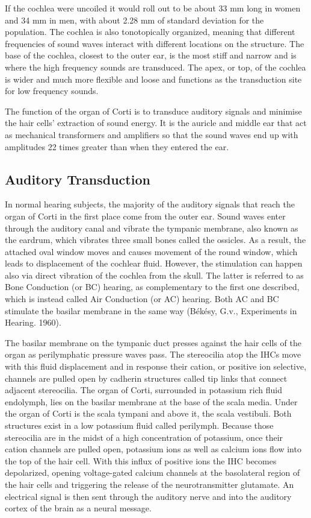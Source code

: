 If the cochlea were uncoiled it would roll out to be about 33 mm long in women and 34 mm in men, with about 2.28 mm of standard deviation for the population. The cochlea is also tonotopically organized, meaning that different frequencies of sound waves interact with different locations on the structure. The base of the cochlea, closest to the outer ear, is the most stiff and narrow and is where the high frequency sounds are transduced. The apex, or top, of the cochlea is wider and much more flexible and loose and functions as the transduction site for low frequency sounds.

The function of the organ of Corti is to transduce auditory signals and minimise the hair cells' extraction of sound energy. It is the auricle and middle ear that act as mechanical transformers and amplifiers so that the sound waves end up with amplitudes 22 times greater than when they entered the ear.

\hypertarget{auditory-transduction}{%
\subsection{Auditory Transduction}\label{auditory-transduction}}

In normal hearing subjects, the majority of the auditory signals that reach the organ of Corti in the first place come from the outer ear. Sound waves enter through the auditory canal and vibrate the tympanic membrane, also known as the eardrum, which vibrates three small bones called the ossicles. As a result, the attached oval window moves and causes movement of the round window, which leads to displacement of the cochlear fluid. However, the stimulation can happen also via direct vibration of the cochlea from the skull. The latter is referred to as Bone Conduction (or BC) hearing, as complementary to the first one described, which is instead called Air Conduction (or AC) hearing. Both AC and BC stimulate the basilar membrane in the same way (Békésy, G.v., Experiments in Hearing. 1960).

The basilar membrane on the tympanic duct presses against the hair cells of the organ as perilymphatic pressure waves pass. The stereocilia atop the IHCs move with this fluid displacement and in response their cation, or positive ion selective, channels are pulled open by cadherin structures called tip links that connect adjacent stereocilia. The organ of Corti, surrounded in potassium rich fluid endolymph, lies on the basilar membrane at the base of the scala media. Under the organ of Corti is the scala tympani and above it, the scala vestibuli. Both structures exist in a low potassium fluid called perilymph. Because those stereocilia are in the midst of a high concentration of potassium, once their cation channels are pulled open, potassium ions as well as calcium ions flow into the top of the hair cell. With this influx of positive ions the IHC becomes depolarized, opening voltage-gated calcium channels at the basolateral region of the hair cells and triggering the release of the neurotransmitter glutamate. An electrical signal is then sent through the auditory nerve and into the auditory cortex of the brain as a neural message.

